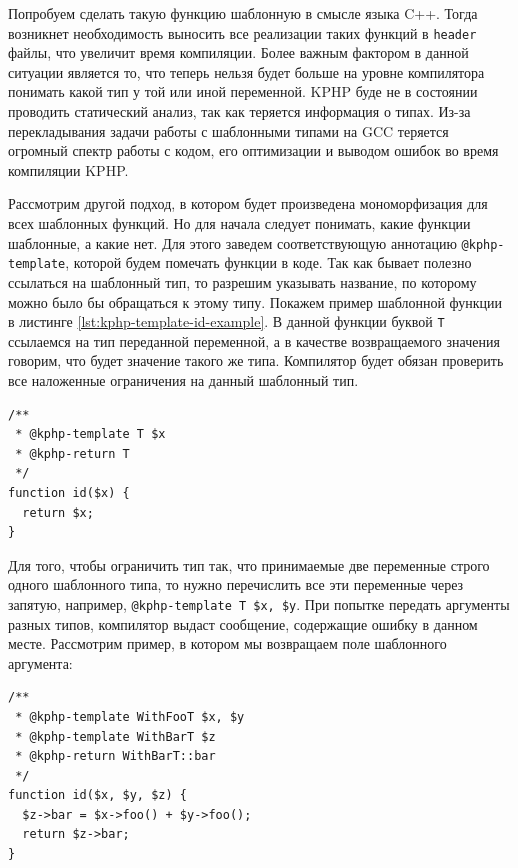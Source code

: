 Попробуем сделать такую функцию шаблонную в смысле языка C++.
Тогда возникнет необходимость выносить все реализации таких функций в \verb|header| файлы, что увеличит время компиляции.
Более важным фактором в данной ситуации является то, что теперь нельзя будет больше на уровне компилятора понимать какой тип у той или иной переменной.
KPHP буде не в состоянии проводить статический анализ, так как теряется информация о типах.
Из-за перекладывания задачи работы с шаблонными типами на GCC \cite{gcc} теряется огромный спектр работы с кодом, его оптимизации и выводом ошибок во время компиляции KPHP.

Рассмотрим другой подход, в котором будет произведена мономорфизация для всех шаблонных функций.
Но для начала следует понимать, какие функции шаблонные, а какие нет.
Для этого заведем соответствующую аннотацию \verb|@kphp-template|, которой будем помечать функции в коде.
Так как бывает полезно ссылаться на шаблонный тип, то разрешим указывать название, по которому можно было бы обращаться к этому типу.
Покажем пример шаблонной функции в листинге \ref{lst:kphp-template-id-example}.
В данной функции буквой \verb|T| ссылаемся на тип переданной переменной,  а в качестве возвращаемого значения говорим, что будет значение такого же типа.
Компилятор будет обязан проверить все наложенные ограничения на данный шаблонный тип.
\begin{lstlisting}[caption={Пример функции id, с применением шаблонов},label={lst:kphp-template-id-example}]
/**
 * @kphp-template T $x
 * @kphp-return T
 */
function id($x) {
  return $x;
}
\end{lstlisting}

Для того, чтобы ограничить тип так, что принимаемые две переменные строго одного шаблонного типа, то нужно перечислить все эти переменные через запятую, например, \verb|@kphp-template T $x, $y|.
При попытке передать аргументы разных типов, компилятор выдаст сообщение, содержащие ошибку в данном месте.
Рассмотрим пример, в котором мы возвращаем поле шаблонного аргумента:
\begin{lstlisting}[caption={Пример функции id, с применением шаблонов},label={lst:kphp-dependent-template-example}]
/**
 * @kphp-template WithFooT $x, $y
 * @kphp-template WithBarT $z
 * @kphp-return WithBarT::bar
 */
function id($x, $y, $z) {
  $z->bar = $x->foo() + $y->foo();
  return $z->bar;
}
\end{lstlisting}

